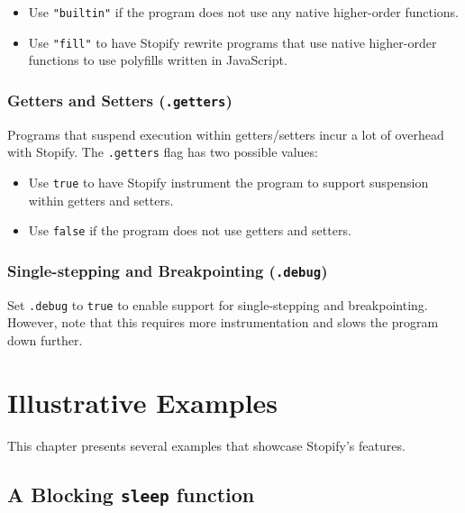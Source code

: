 \documentclass[10pt]{book}
\begin{document}
\begin{itemize}

  \item Use \lstinline|"builtin"| if the program does not use any native
  higher-order functions.

  \item Use \lstinline|"fill"| to have Stopify rewrite programs that use native
    higher-order functions to use polyfills written in JavaScript.

\end{itemize}

\subsection{Getters and Setters (\texttt{.getters})\label{getters-flag}}

Programs that suspend execution within getters/setters incur a lot of overhead
with Stopify. The \lstinline|.getters| flag has two possible values:

\begin{itemize}

  \item Use \lstinline|true| to have Stopify instrument the program to
  support suspension within getters and setters.

  \item Use \lstinline|false| if the program does not use getters and setters.

\end{itemize}

\subsection{Single-stepping and Breakpointing (\texttt{.debug})\label{debug-flag}}

 Set \lstinline|.debug| to \lstinline|true| to enable
support for single-stepping and breakpointing. However, note that this requires
more instrumentation and slows the program down further.

\chapter{Illustrative Examples\label{illustrative-examples}}

\lstset{language=js}
This chapter presents several examples that showcase Stopify's features.

\section{A Blocking \texttt{sleep} function}
\end{document}
